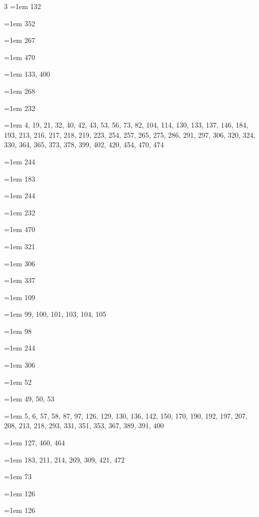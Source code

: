 \begin{multicols}{3}
\hangindent=1em  132\par
\hangindent=1em  352\par
\hangindent=1em  267\par
\hangindent=1em  470\par
\hangindent=1em  133, 400\par
\hangindent=1em  268\par
\hangindent=1em  232\par
\hangindent=1em  4, 19, 21, 32, 40, 42, 43, 53, 56, 73, 82, 104, 114, 130, 133, 137, 146, 184, 193, 213, 216, 217, 218, 219, 223, 254, 257, 265, 275, 286, 291, 297, 306, 320, 324, 330, 364, 365, 373, 378, 399, 402, 420, 454, 470, 474\par
\hangindent=1em  244\par
\hangindent=1em  183\par
\hangindent=1em  244\par
\hangindent=1em  232\par
\hangindent=1em  470\par
\hangindent=1em  321\par
\hangindent=1em  306\par
\hangindent=1em  337\par
\hangindent=1em  109\par
\hangindent=1em  99, 100, 101, 103, 104, 105\par
\hangindent=1em  98\par
\hangindent=1em  244\par
\hangindent=1em  306\par
\hangindent=1em  52\par
\hangindent=1em  49, 50, 53\par
\hangindent=1em  5, 6, 57, 58, 87, 97, 126, 129, 130, 136, 142, 150, 170, 190, 192, 197, 207, 208, 213, 218, 293, 331, 351, 353, 367, 389, 391, 400\par
\hangindent=1em  127, 460, 464\par
\hangindent=1em  183, 211, 214, 269, 309, 421, 472\par
\hangindent=1em  73\par
\hangindent=1em  126\par
\hangindent=1em  126\par

\end{multicols}
